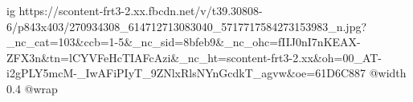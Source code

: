  
 
 
 
 

\ifcmt
  ig https://scontent-frt3-2.xx.fbcdn.net/v/t39.30808-6/p843x403/270934308_614712713083040_5717717584273153983_n.jpg?_nc_cat=103&ccb=1-5&_nc_sid=8bfeb9&_nc_ohc=fIIJ0nI7nKEAX-ZFX3n&tn=lCYVFeHcTIAFcAzi&_nc_ht=scontent-frt3-2.xx&oh=00_AT-i2gPLY5mcM-_IwAFiPIyT_9ZNlxRlsNYnGcdkT_agvw&oe=61D6C887
  @width 0.4
  @wrap \parpic[r]
\fi
